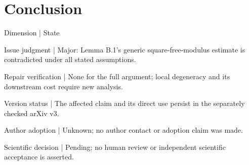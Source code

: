 \documentclass[10pt]{article}
\begin{document}
\section*{Conclusion}
Dimension | State\par
Issue judgment | Major: Lemma B.1’s generic square-free-modulus estimate is contradicted under all stated assumptions.\par
Repair verification | None for the full argument; local degeneracy and its downstream cost require new analysis.\par
Version status | The affected claim and its direct use persist in the separately checked arXiv v3.\par
Author adoption | Unknown; no author contact or adoption claim was made.\par
Scientific decision | Pending; no human review or independent scientific acceptance is asserted.\par
\end{document}
